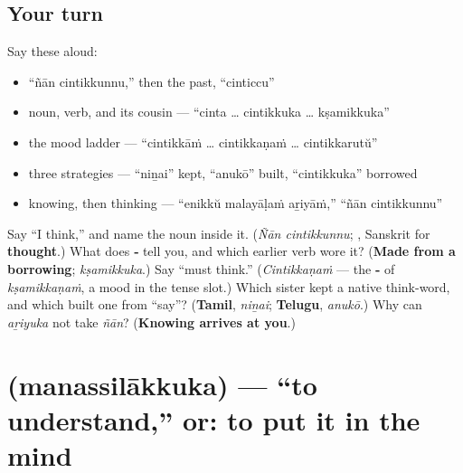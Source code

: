 \subsection*{Your turn}
Say these aloud:

\begin{itemize}
\raggedright
  \item \textquotedblleft{}ñān cintikkunnu,\textquotedblright{} then the past, \textquotedblleft{}cinticcu\textquotedblright{}
  \item noun, verb, and its cousin — \textquotedblleft{}cinta … cintikkuka … kṣamikkuka\textquotedblright{}
  \item the mood ladder — \textquotedblleft{}cintikkāṁ … cintikkaṇaṁ … cintikkarutŭ\textquotedblright{}
  \item three strategies — \textquotedblleft{}niṉai\textquotedblright{} kept, \textquotedblleft{}anukō\textquotedblright{} built, \textquotedblleft{}cintikkuka\textquotedblright{} borrowed
  \item knowing, then thinking — \textquotedblleft{}enikkŭ malayāḷaṁ aṟiyāṁ,\textquotedblright{} \textquotedblleft{}ñān cintikkunnu\textquotedblright{}
\end{itemize}

\begin{tcolorbox}[breakable,colback=teal!4,colframe=teal!35!black,title={Before you move on}]
Say \textquotedblleft{}I think,\textquotedblright{} and name the noun inside it. (\emph{Ñān cintikkunnu}; \textbf{}, Sanskrit for \textbf{thought}.) What does \textbf{‑} tell you, and which earlier verb wore it? (\textbf{Made from a borrowing}; \emph{kṣamikkuka}.) Say \textquotedblleft{}must think.\textquotedblright{} (\emph{Cintikkaṇaṁ} — the \textbf{‑} of \emph{kṣamikkaṇaṁ}, a mood in the tense slot.) Which sister kept a native think-word, and which built one from \textquotedblleft{}say\textquotedblright{}? (\textbf{Tamil}, \emph{niṉai}; \textbf{Telugu}, \emph{anukō}.) Why can \emph{aṟiyuka} not take \emph{ñān}? (\textbf{Knowing arrives at you}.)
\end{tcolorbox}
\section[\texorpdfstring{\ml{മനസ്സിലാക്കുക} (manassilākkuka)}{മനസ്സിലാക്കുക (manassilākkuka)}]{ (manassilākkuka) — \textquotedblleft{}to understand,\textquotedblright{} or: to put it in the mind}

\label{lesson:ML-C33-manassilaakkuka}



